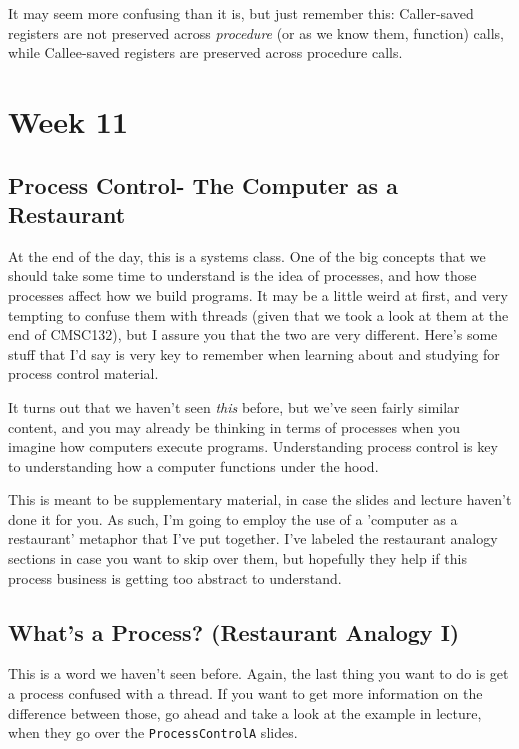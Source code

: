 \documentclass[english, 10pt]{article}
\begin{document}
It may seem more confusing than it is, but just remember this: Caller-saved registers are not preserved across \textit{procedure} (or as we know them, function) calls, while Callee-saved registers are preserved across procedure calls.

\section{Week 11}

\subsection{Process Control- The Computer as a Restaurant}

At the end of the day, this is a systems class. One of the big concepts that we should take some time to understand is the idea of processes, and how those processes affect how we build programs. It may be a little weird at first, and very tempting to confuse them with threads (given that we took a look at them at the end of CMSC132), but I assure you that the two are very different. Here's some stuff that I'd say is very key to remember when learning about and studying for process control material.\newline

It turns out that we haven't seen \textit{this} before, but we've seen fairly similar content, and you may already be thinking in terms of processes when you imagine how computers execute programs. Understanding process control is key to understanding how a computer functions under the hood.\newline

This is meant to be supplementary material, in case the slides and lecture haven't done it for you. As such, I'm going to employ the use of a 'computer as a restaurant' metaphor that I've put together. I've labeled the restaurant analogy sections in case you want to skip over them, but hopefully they help if this process business is getting too abstract to understand.

\subsection{What's a Process? (Restaurant Analogy I)}

This is a word we haven't seen before. Again, the last thing you want to do is get a process confused with a thread.
If you want to get more information on the difference between those, go ahead and take a look at the example in lecture, when they go over the \texttt{ProcessControlA} slides.\newline
\end{document}

